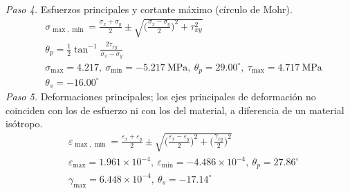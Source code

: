 \documentclass[11pt]{article}
\begin{document}
\textit{Paso 4.} Esfuerzos principales y cortante máximo (círculo de Mohr).
\begin{align*}
&\sigma_{\max,\min}=\frac{\sigma_x+\sigma_y}{2}\pm\sqrt{\Big(\frac{\sigma_x-\sigma_y}{2}\Big)^2+\tau_{xy}^2} \\
&\theta_p=\tfrac12\tan^{-1}\frac{2\tau_{xy}}{\sigma_x-\sigma_y} \\
&\sigma_{\max}=4.217,\ \sigma_{\min}=-5.217\ \mathrm{MPa},\ \theta_p=29.00^\circ,\ \tau_{\max}=4.717\ \mathrm{MPa} \\
&\theta_s=-16.00^\circ
\end{align*}
\textit{Paso 5.} Deformaciones principales; los ejes principales de deformación no coinciden con los de esfuerzo ni con los del material, a diferencia de un material isótropo.
\begin{align*}
&\varepsilon_{\max,\min}=\frac{\varepsilon_x+\varepsilon_y}{2}\pm\sqrt{\Big(\frac{\varepsilon_x-\varepsilon_y}{2}\Big)^2+\Big(\frac{\gamma_{xy}}{2}\Big)^2} \\
&\varepsilon_{\max}=1.961\times10^{-4},\ \varepsilon_{\min}=-4.486\times10^{-4},\ \theta_p=27.86^\circ \\
&\gamma_{\max}=6.448\times10^{-4},\ \theta_s=-17.14^\circ
\end{align*}
\end{document}
